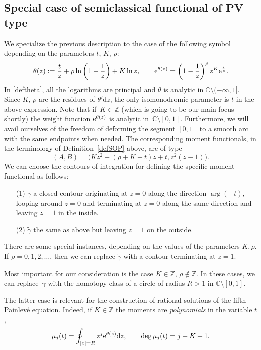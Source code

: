 \documentclass[pdftex]{sigma}
\numberwithin{equation}{section}
\theoremstyle{definition}
\def\le{\left}
\def\ri{\right}
\def \wt{ \widetilde }
\def \d{{\mathrm d}}
\def\be{\begin{equation}}
\def\ee{\end{equation}}
\def\C{{\mathbb C}}
\def\Z{{\mathbb Z}}
\def\la{\label}
\begin{document}
\subsection{Special case of semiclassical functional of PV type}
We specialize the previous description to the case of the following symbol depending on the parameters $t$, ${ {K}}$, ${ {\rho}}$:
\be
\label{deftheta}
{\theta(z)} := \frac t z +{ {\rho}} \ln \le(1- \frac 1 z\ri) + { {K}} \ln z, \qquad {\rm e}^{\theta(z)} = \le(1 - \frac 1 z\ri)^{ {\rho}} z^{{ {K}}} {\rm e}^{\frac t z}.
\ee
In \eqref{deftheta}, all the logarithms are principal and $\theta$ is analytic in $\C\setminus (-\infty, 1]$.
Since ${K}$, $ {\rho}$ are the residues of $\theta'\d z$, the only isomonodromic parameter is $t$ in the above expression.
 Note that if~${ {K}} \in \Z$ (which is going to be our main focus shortly) the weight function ${\rm e}^{\theta(z)}$ is analytic in~${\C\setminus [0,1]}$. Furthermore, we will avail ourselves of the freedom of deforming the segment $[0,1]$ to a smooth arc with the same endpoints when needed.
The corresponding moment functionals, in the terminology of Definition~\ref{defSOP} above, are of type
\be
(A,B) = \bigl({ {K}} z^2 + ({ {\rho}} + { {K}}+t)z + t, z^2(z-1)\bigr).
\la{AB}
\ee
We can choose the contours of integration for defining the specific moment functional as follows:%
\begin{enumerate}\itemsep=0pt
\item[(1)] $ \gamma$ a closed contour originating at $z=0$ along the direction $\arg (-t)$, looping around $z=0$ and terminating at $z=0$ along the same direction and leaving $z=1$ in the inside.
\item[(2)] $\wt \gamma$ the same as above but leaving $z=1$ on the outside.
\end{enumerate}
There are some special instances, depending on the values of the parameters ${ {K}}, { {\rho}}$. If ${ {\rho}}=0,1,2,\dots $, then we can replace $\wt \gamma$ with a contour terminating at $z=1$.

Most important for our consideration is the case ${K} \in \Z$, ${ {\rho}} \not\in \Z$. In these cases, we can replace~$\gamma$ with the homotopy class of a circle of radius $R>1$ in $\C\setminus [0,1]$.

The latter case is relevant for the construction of rational solutions of the fifth Painlev\'e equation. Indeed, if ${K}\in \Z$ the moments are {\it polynomials} in the variable $t$,
\be
\la{defmuj}
\mu_j(t) = \oint_{|z|=R} z^j {\rm e}^{\theta(z)}\d z, \qquad \deg \mu_j (t) = j+{K}+1.
\ee
\end{document}
